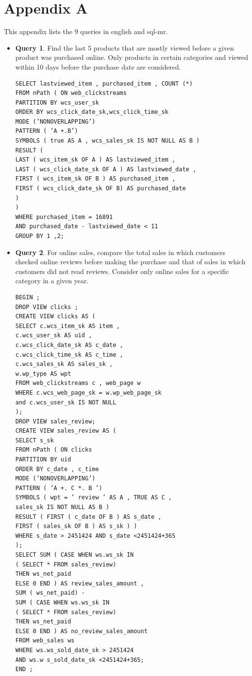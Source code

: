 \documentclass[12pt]{book}
\begin{document}
\chapter*{Appendix A}
\label{appendixa}
This appendix lists the 9 queries in english and sql-mr.
\begin{itemize}
 \item \textbf{Query 1}. Find the last 5 products that are mostly viewed before a given product was purchased online. Only products in 
 certain categories and viewed within 10 days before the purchase date are considered.
\lstset{language=SQL,basicstyle=\ttfamily}
\begin{lstlisting}[frame=single]
SELECT lastviewed_item , purchased_item , COUNT (*)
FROM nPath ( ON web_clickstreams
PARTITION BY wcs_user_sk
ORDER BY wcs_click_date_sk,wcs_click_time_sk
MODE (’NONOVERLAPPING’)
PATTERN ( ’A +.B’)
SYMBOLS ( true AS A , wcs_sales_sk IS NOT NULL AS B )
RESULT (
LAST ( wcs_item_sk OF A ) AS lastviewed_item ,
LAST ( wcs_click_date_sk OF A ) AS lastviewed_date ,
FIRST ( wcs_item_sk OF B ) AS purchased_item ,
FIRST ( wcs_click_date_sk OF B) AS purchased_date
)
)
WHERE purchased_item = 16891
AND purchased_date - lastviewed_date < 11
GROUP BY 1 ,2;
\end{lstlisting}
\item \textbf{Query 2}. For online sales, compare the total sales in which customers checked online reviews before making the purchase and 
that of sales in which customers did not read reviews. Consider only online sales for a specific category in a given year.
\begin{lstlisting}[frame=single]
BEGIN ;
DROP VIEW clicks ;
CREATE VIEW clicks AS (
SELECT c.wcs_item_sk AS item ,
c.wcs_user_sk AS uid ,
c.wcs_click_date_sk AS c_date ,
c.wcs_click_time_sk AS c_time ,
c.wcs_sales_sk AS sales_sk ,
w.wp_type AS wpt
FROM web_clickstreams c , web_page w
WHERE c.wcs_web_page_sk = w.wp_web_page_sk
and c.wcs_user_sk IS NOT NULL
);
DROP VIEW sales_review;
CREATE VIEW sales_review AS (
SELECT s_sk
FROM nPath ( ON clicks
PARTITION BY uid
ORDER BY c_date , c_time
MODE (’NONOVERLAPPING’)
PATTERN ( ’A +. C *. B ’)
SYMBOLS ( wpt = ’ review ’ AS A , TRUE AS C ,
sales_sk IS NOT NULL AS B )
RESULT ( FIRST ( c_date OF B ) AS s_date ,
FIRST ( sales_sk OF B ) AS s_sk ) )
WHERE s_date > 2451424 AND s_date <2451424+365
);
SELECT SUM ( CASE WHEN ws.ws_sk IN 
( SELECT * FROM sales_review)
THEN ws_net_paid
ELSE 0 END ) AS review_sales_amount ,
SUM ( ws_net_paid) -
SUM ( CASE WHEN ws.ws_sk IN 
( SELECT * FROM sales_review)
THEN ws_net_paid
ELSE 0 END ) AS no_review_sales_amount
FROM web_sales ws
WHERE ws.ws_sold_date_sk > 2451424
AND ws.w s_sold_date_sk <2451424+365;
END ;
\end{lstlisting}


\end{itemize}
\end{document}

